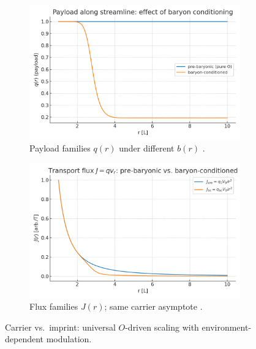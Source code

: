 \documentclass[12pt,a4paper,oneside]{scrreprt}
\begin{document}
\begin{figure}[htbp]
  \vspace{0.6em}
  \begin{subfigure}[t]{0.49\linewidth}
    \includegraphics[width=\linewidth]{fig/payload_profiles.png}
    \caption{Payload families $q(r)$ under different $b(r)$
      \cite{Zwanzig2001}.}
    \label{fig:carrier:payload}
  \end{subfigure}\hfill
  \begin{subfigure}[t]{0.49\linewidth}
    \includegraphics[width=\linewidth]{fig/flux_profiles.png}
    \caption{Flux families $J(r)$; same carrier asymptote
      \cite{Weiss1999}.}
    \label{fig:carrier:flux}
  \end{subfigure}
  \caption{Carrier vs.\ imprint: universal $O$-driven scaling with
  environment-dependent modulation.}
  \label{fig:carrier:benchmark}
\end{figure}
\end{document}
